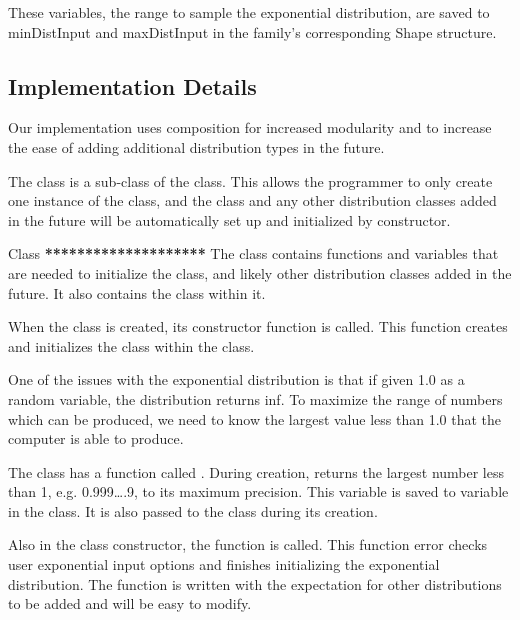 \documentclass[letterpaper,10pt,english]{sphinxmanual}
\begin{document}
These variables, the range to sample the exponential distribution, are saved to
minDistInput and maxDistInput in the family’s corresponding Shape structure.


\subsection{Implementation Details}
\label{dfngen:implementation-details}
Our implementation uses
composition for increased modularity and to increase the ease of adding
additional distribution types in the future.

The  class is a sub-class of the  class. This allows
the programmer to only create one instance of the  class, and
the  class and any other distribution classes added in the future
will be automatically set up and initialized by  constructor.

 Class \textbf{********************} The  class
contains functions and variables that are needed to initialize the 
class, and likely other distribution classes added in the future. It also
contains the  class within it.

When the  class is created, its constructor function is called.
This function creates and initializes the  class within the
 class.

One of the issues with the exponential distribution is that if given 1.0 as a
random variable, the distribution returns inf. To maximize the range of numbers
which can be produced, we need to know the largest value less than 1.0 that the
computer is able to produce.

The  class has a function called .
During  creation,  returns the largest
number less than 1, e.g. 0.999….9, to its maximum precision. This variable is
saved to variable  in the  class. It is also passed
to the  class during its creation.

Also in the  class constructor, the function
 is called. This function error checks user
exponential input options and finishes initializing the exponential
distribution. The function is written with the expectation for other
distributions to be added and will be easy to modify.
\end{document}
